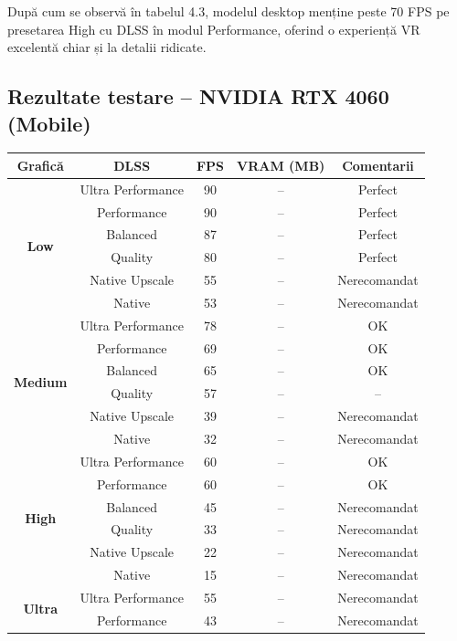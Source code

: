 După cum se observă în tabelul 4.3, modelul desktop menține peste 70 FPS pe presetarea High cu DLSS în modul Performance, oferind o experiență VR excelentă chiar și la detalii ridicate.
\clearpage

\subsection*{Rezultate testare – NVIDIA RTX 4060 (Mobile)}

\begin{table}[htbp]
\centering
\renewcommand{\arraystretch}{1.2}
\begin{tabular}{|c|c|c|c|c|}
\hline
\textbf{Grafică} & \textbf{DLSS} & \textbf{FPS} & \textbf{VRAM (MB)} & \textbf{Comentarii} \\
\hline
\multirow{6}{*}{\textbf{Low}} & Ultra Performance & 90 & -- & Perfect \\
 & Performance       & 90 & -- & Perfect \\
 & Balanced          & 87 & -- & Perfect \\
 & Quality           & 80 & -- & Perfect \\
 & Native Upscale    & 55 & -- & Nerecomandat \\
 & Native            & 53 & -- & Nerecomandat \\
\hline
\multirow{6}{*}{\textbf{Medium}} & Ultra Performance & 78 & -- & OK \\
 & Performance       & 69 & -- & OK \\
 & Balanced          & 65 & -- & OK \\
 & Quality           & 57 & -- & -- \\
 & Native Upscale    & 39 & -- & Nerecomandat \\
 & Native            & 32 & -- & Nerecomandat \\
\hline
\multirow{6}{*}{\textbf{High}} & Ultra Performance & 60 & -- & OK \\
 & Performance       & 60 & -- & OK \\
 & Balanced          & 45 & -- & Nerecomandat \\
 & Quality           & 33 & -- & Nerecomandat \\
 & Native Upscale    & 22 & -- & Nerecomandat \\
 & Native            & 15 & -- & Nerecomandat \\
\hline
\multirow{6}{*}{\textbf{Ultra}} & Ultra Performance & 55 & -- & Nerecomandat \\
 & Performance       & 43 & -- & Nerecomandat \\

\end{tabular}
\end{table}
